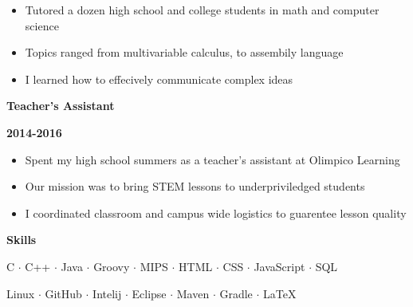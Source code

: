 \documentclass[12pt]{report}
\newcommand\barTitle[1]{\begin{center} \begin{Large}{\textbf{#1}}\end{Large}\end{center}}
\newcommand\tbf[1]{\begin{large} \textbf{#1} \end{large}}
\begin{document}
\begin{itemize}
\item Tutored a dozen high school and college students in math and computer science
\item Topics ranged from multivariable calculus, to assembily language 
\item I learned how to effecively communicate complex ideas
\end{itemize}

\begin{flushleft}
\tbf{Teacher's Assistant} \hfill \tbf{2014-2016}
\end{flushleft}

\begin{itemize}
\item Spent my high school summers as a teacher's assistant at Olimpico Learning
\item Our mission was to bring STEM lessons to underpriviledged students
\item I coordinated classroom and campus wide logistics to guarentee lesson quality  
\end{itemize}


\noindent\makebox[\linewidth]{\rule{7.5in}{0.4pt}}
\barTitle{Skills}
\begin{center}
C $\cdot$ C++ $\cdot$ Java $\cdot$ Groovy $\cdot$  MIPS $\cdot$ HTML $\cdot$ CSS $\cdot$ JavaScript $\cdot$ SQL 
\end{center}
\begin{center}
 Linux $\cdot$ GitHub $\cdot$ Intelij $\cdot$ Eclipse $\cdot$ Maven $\cdot$ Gradle $\cdot$ LaTeX
\end{center}
\end{document}
